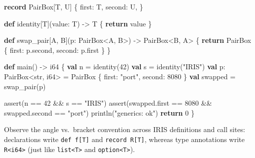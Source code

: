 \documentclass[
  english,
  oneside]{book}
\newenvironment{Shaded}{\begin{snugshade}}{\end{snugshade}}
\newcommand{\ControlFlowTok}[1]{\textcolor[rgb]{0.77,0.53,0.75}{\textbf{#1}}}
\newcommand{\DataTypeTok}[1]{\textcolor[rgb]{0.31,0.79,0.69}{#1}}
\newcommand{\DecValTok}[1]{\textcolor[rgb]{0.71,0.81,0.66}{#1}}
\newcommand{\FunctionTok}[1]{\textcolor[rgb]{0.86,0.86,0.67}{#1}}
\newcommand{\KeywordTok}[1]{\textcolor[rgb]{0.34,0.61,0.84}{\textbf{#1}}}
\newcommand{\NormalTok}[1]{\textcolor[rgb]{0.83,0.83,0.83}{#1}}
\newcommand{\OperatorTok}[1]{\textcolor[rgb]{0.83,0.83,0.83}{#1}}
\newcommand{\StringTok}[1]{\textcolor[rgb]{0.81,0.57,0.47}{#1}}
\begin{document}
\begin{Shaded}
\begin{Highlighting}[]
\KeywordTok{record}\NormalTok{ PairBox[T, U] \{}
\NormalTok{    first: T,}
\NormalTok{    second: U,}
\NormalTok{\}}

\KeywordTok{def}\NormalTok{ identity[T](value: T) }\OperatorTok{{-}\textgreater{}}\NormalTok{ T \{}
    \ControlFlowTok{return}\NormalTok{ value}
\NormalTok{\}}

\KeywordTok{def}\NormalTok{ swap\_pair[A, B](p: PairBox}\OperatorTok{\textless{}}\NormalTok{A, B}\OperatorTok{\textgreater{}}\NormalTok{) }\OperatorTok{{-}\textgreater{}}\NormalTok{ PairBox}\OperatorTok{\textless{}}\NormalTok{B, A}\OperatorTok{\textgreater{}}\NormalTok{ \{}
    \ControlFlowTok{return}\NormalTok{ PairBox \{ first: p}\OperatorTok{.}\NormalTok{second, second: p}\OperatorTok{.}\NormalTok{first \}}
\NormalTok{\}}

\KeywordTok{def}\NormalTok{ main() }\OperatorTok{{-}\textgreater{}} \DataTypeTok{i64}\NormalTok{ \{}
    \KeywordTok{val}\NormalTok{ n }\OperatorTok{=}\NormalTok{ identity(}\DecValTok{42}\NormalTok{)}
    \KeywordTok{val}\NormalTok{ s }\OperatorTok{=}\NormalTok{ identity(}\StringTok{"IRIS"}\NormalTok{)}
    \KeywordTok{val}\NormalTok{ p: PairBox}\OperatorTok{\textless{}}\DataTypeTok{str}\NormalTok{, }\DataTypeTok{i64}\OperatorTok{\textgreater{}} \OperatorTok{=}\NormalTok{ PairBox \{ first: }\StringTok{"port"}\NormalTok{, second: }\DecValTok{8080}\NormalTok{ \}}
    \KeywordTok{val}\NormalTok{ swapped }\OperatorTok{=}\NormalTok{ swap\_pair(p)}

    \FunctionTok{assert}\NormalTok{(n }\OperatorTok{==} \DecValTok{42} \OperatorTok{\&\&}\NormalTok{ s }\OperatorTok{==} \StringTok{"IRIS"}\NormalTok{)}
    \FunctionTok{assert}\NormalTok{(swapped}\OperatorTok{.}\NormalTok{first }\OperatorTok{==} \DecValTok{8080} \OperatorTok{\&\&}\NormalTok{ swapped}\OperatorTok{.}\NormalTok{second }\OperatorTok{==} \StringTok{"port"}\NormalTok{)}
\NormalTok{    println(}\StringTok{"generics: ok"}\NormalTok{)}
    \ControlFlowTok{return} \DecValTok{0}
\NormalTok{\}}
\end{Highlighting}
\end{Shaded}

Observe the angle vs.~bracket convention across IRIS definitions and
call sites: declarations write \texttt{def\ f{[}T{]}} and
\texttt{record\ R{[}T{]}}, whereas type annotations write
\texttt{R\textless{}i64\textgreater{}} (just like
\texttt{list\textless{}T\textgreater{}} and
\texttt{option\textless{}T\textgreater{}}).
\end{document}
